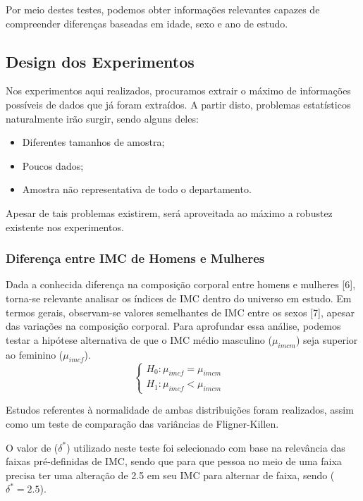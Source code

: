 \documentclass[
]{article}
\providecommand{\tightlist}{%
  \setlength{\itemsep}{0pt}\setlength{\parskip}{0pt}}
\begin{document}
Por meio destes testes, podemos obter informações relevantes capazes de
compreender diferenças baseadas em idade, sexo e ano de estudo.

\subsection{Design dos Experimentos}\label{design-dos-experimentos}

Nos experimentos aqui realizados, procuramos extrair o máximo de
informações possíveis de dados que já foram extraídos. A partir disto,
problemas estatísticos naturalmente irão surgir, sendo alguns deles:

\begin{itemize}
\tightlist
\item
  Diferentes tamanhos de amostra;
\item
  Poucos dados;
\item
  Amostra não representativa de todo o departamento.
\end{itemize}

Apesar de tais problemas existirem, será aproveitada ao máximo a
robustez existente nos experimentos.

\subsubsection{Diferença entre IMC de Homens e
Mulheres}\label{diferenuxe7a-entre-imc-de-homens-e-mulheres}

Dada a conhecida diferença na composição corporal entre homens e
mulheres {[}6{]}, torna-se relevante analisar os índices de IMC dentro
do universo em estudo. Em termos gerais, observam-se valores semelhantes
de IMC entre os sexos {[}7{]}, apesar das variações na composição
corporal. Para aprofundar essa análise, podemos testar a hipótese
alternativa de que o IMC médio masculino (\(\mu_{imcm}\)) seja superior
ao feminino (\(\mu_{imcf}\)).
\[\begin{cases} H_0: \mu_{imcf} = \mu_{imcm}&\\H_1: \mu_{imcf}<\mu_{imcm}\end{cases}\]

Estudos referentes à normalidade de ambas distribuições foram
realizados, assim como um teste de comparação das variâncias de
Fligner-Killen.

O valor de (\(\delta^*\)) utilizado neste teste foi selecionado com base
na relevância das faixas pré-definidas de IMC, sendo que para que pessoa
no meio de uma faixa precisa ter uma alteração de 2.5 em seu IMC para
alternar de faixa, sendo (\(\delta^*=2.5\)).
\end{document}
